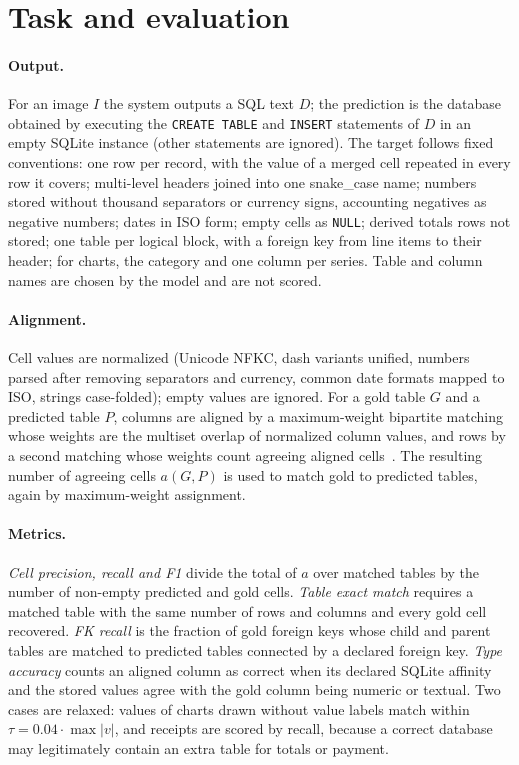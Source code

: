 \documentclass[10pt,twocolumn]{article}
\begin{document}
\section{Task and evaluation}
\label{sec:task}

\paragraph{Output.} For an image $I$ the system outputs a SQL text $D$; the prediction is the database obtained by
executing the \texttt{CREATE TABLE} and \texttt{INSERT} statements of $D$ in an empty SQLite instance (other
statements are ignored). The target follows fixed conventions: one row per record, with the value of a merged
cell repeated in every row it covers; multi-level headers joined into one snake\_case name; numbers stored without
thousand separators or currency signs, accounting negatives as negative numbers; dates in ISO form; empty cells
as \texttt{NULL}; derived totals rows not stored; one table per logical block, with a foreign key from line items
to their header; for charts, the category and one column per series. Table and column names are chosen by the
model and are not scored.

\paragraph{Alignment.} Cell values are normalized (Unicode NFKC, dash variants unified, numbers parsed after
removing separators and currency, common date formats mapped to ISO, strings case-folded); empty values are
ignored. For a gold table $G$ and a predicted table $P$, columns are aligned by a maximum-weight bipartite matching
whose weights are the multiset overlap of normalized column values, and rows by a second matching whose weights
count agreeing aligned cells~\citep{kuhn1955hungarian}. The resulting number of agreeing cells $a(G,P)$ is used to
match gold to predicted tables, again by maximum-weight assignment.

\paragraph{Metrics.} \emph{Cell precision, recall and F1} divide the total of $a$ over matched tables by the number
of non-empty predicted and gold cells. \emph{Table exact match} requires a matched table with the same number of
rows and columns and every gold cell recovered. \emph{FK recall} is the fraction of gold foreign keys whose child
and parent tables are matched to predicted tables connected by a declared foreign key. \emph{Type accuracy} counts
an aligned column as correct when its declared SQLite affinity and the stored values agree with the gold column
being numeric or textual. Two cases are relaxed: values of charts drawn without value labels match within
$\tau = 0.04\cdot\max|v|$, and receipts are scored by recall, because a correct database may legitimately contain
an extra table for totals or payment.
\end{document}

